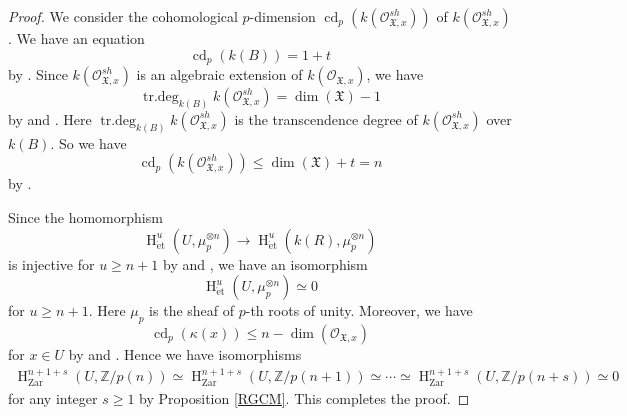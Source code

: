 \documentclass{article}
\newcommand{\et}{\mathrm{\acute{e}t}}
\newcommand{\Zar}{\mathrm{Zar}}
\newcommand{\HO}{\operatorname{H}}
\begin{document}
\begin{proof}
We consider the cohomological $p$-dimension
$\operatorname{cd}_{p}(k(\mathcal{O}_{\mathfrak{X}, x}^{sh}))$
of $k(\mathcal{O}_{\mathfrak{X}, x}^{sh})$. We have an equation
%
\begin{equation*}
\operatorname{cd}_{p}(k(B))=1+t    
\end{equation*}
%
by \cite[p.48, Th\'{e}or\`{e}me 1.2]{G-O}.
Since $k(\mathcal{O}_{\mathfrak{X}, x}^{sh})$
is an algebraic extension of $k(\mathcal{O}_{\mathfrak{X}, x})$,
we have
%
\begin{equation*}
\operatorname{tr.deg}_{k(B)}k(\mathcal{O}^{sh}_{\mathfrak{X}, x})
=
\operatorname{dim}(\mathfrak{X})-1
\end{equation*}
%
by \cite[pp.118--119, Theorem 15.5]{Ma} and \cite[p.119, Theorem 15.6]{Ma}.
Here 
$\operatorname{tr.deg}_{k(B)}k(\mathcal{O}^{sh}_{\mathfrak{X}, x})$
is the transcendence degree of $k(\mathcal{O}^{sh}_{\mathfrak{X}, x})$
over $k(B)$. So we have
%
\begin{equation*}
\operatorname{cd}_{p}(k(\mathcal{O}^{sh}_{\mathfrak{X}, x}))
\leq
\operatorname{dim}(\mathfrak{X})+t=n
\end{equation*}
%
by \cite[p.57, Corollaire 2.3.2]{G-O}.

Since the homomorphism
%
\begin{equation*}
\HO^{u}_{\et}(U, \mu_{p}^{\otimes n})
\to
\HO^{u}_{\et}(k(R), \mu_{p}^{\otimes n})
\end{equation*}
%
is injective for $u\geq n+1$ by \cite[Proposition 4.2]{Sak4} and \cite[Theorem 3.10]{Sak4}, 
we have an isomorphism
%
\begin{equation*}
\HO^{u}_{\et}(
U, \mu_{p}^{\otimes n}
)    
\simeq 
0
\end{equation*}
%
for $u\geq n+1$. Here $\mu_{p}$ is the sheaf of $p$-th roots of unity.
Moreover, we have
%
\begin{equation*}
\operatorname{cd}_{p}(\kappa(x))
\leq 
n-\operatorname{dim}(
\mathcal{O}_{\mathfrak{X}, x}
)
\end{equation*}
%
for $x\in U$
by \cite[p.57, Corollaire 2.3.2]{G-O} and \cite[pp.118--119, Theorem 15.5]{Ma}. 
Hence we have isomorphisms
%
\begin{align*}
\HO^{n+1+s}_{\Zar}(
U,
\mathbb{Z}/p(n)
)
\simeq    
\HO^{n+1+s}_{\Zar}(
U,
\mathbb{Z}/p(n+1)
)
\simeq 
\cdots
\simeq
\HO^{n+1+s}_{\Zar}(
U,
\mathbb{Z}/p(n+s)
)
\simeq
0
\end{align*}
%
for any integer $s\geq 1$ by Proposition \ref{RGCM}. This completes the proof.
\end{proof}
%
\end{document}
